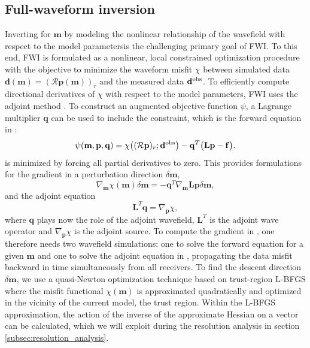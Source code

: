 \documentclass[12pt]{iopart}
\begin{document}
\subsection{Full-waveform inversion}
\label{subsec:FWIproblem}
Inverting for $\mathbf{m}$ by modeling the nonlinear relationship of the wavefield with respect to the model parametersis the challenging primary goal of FWI. To this end, FWI is formulated as a nonlinear, local constrained optimization procedure with the objective to minimize the waveform misfit $\chi$ between simulated data $\mathbf{d}(\mathbf{m})=(\mathcal{R}\mathbf{p}(\mathbf{m}))_r$ and the measured data $\mathbf{d}^{\mbox{\scriptsize obs}}$. To efficiently compute directional derivatives of $\chi$ with respect to the model parameters, FWI uses the adjoint method \cite{Tarantola_1988,Pratt_1999_1,Tromp_adjoints_2005}. To construct an augmented objective function $\psi$, a Lagrange multiplier $\mathbf{q}$ can be used to include the constraint, which is the forward equation in :
\begin{equation}
	\psi(\mathbf{m},\mathbf{p},\mathbf{q})=\chi\big((\mathcal{R}\mathbf{p})_r;\mathbf{d}^{\mbox{\scriptsize obs}}\big)-\mathbf{q}^T\big(\mathbf{L}\mathbf{p}-\mathbf{f}\big).
	\label{eq:Lagrangian_objective}
\end{equation}
 is minimized by forcing all partial derivatives to zero. This provides formulations for the gradient in a perturbation direction $\delta\mathbf{m}$, 
\begin{equation}
	\nabla_{\mathbf{m}}\chi(\mathbf{m})\delta\mathbf{m}=-\mathbf{q}^T\nabla_{\mathbf{m}}\mathbf{L}\mathbf{p}\delta\mathbf{m},
	\label{eq:gradient_misfit}
\end{equation}
and the adjoint equation
\begin{equation}
	\mathbf{L}^T\mathbf{q}=\nabla_{\mathbf{p}}\chi,
	\label{eq:adjoint_equation}
\end{equation}
where $\mathbf{q}$ plays now the role of the adjoint wavefield, $\mathbf{L}^T$ is the adjoint wave operator and $\nabla_{\mathbf{p}}\chi$ is the adjoint source. To compute the gradient in , one therefore needs two wavefield simulations: one to solve the forward equation  for a given $\mathbf{m}$ and one to solve the adjoint equation in , propagating the data misfit backward in time simultaneously from all receivers.  
To find the descent direction $\delta\mathbf{m}$, we use a quasi-Newton optimization technique based on trust-region L-BFGS \cite{Boehm_2018} where the misfit functional $\chi(\mathbf{m})$ is approximated quadratically and optimized in the vicinity of the current model, the trust region. Within the L-BFGS approximation, the action of the inverse of the approximate Hessian on a vector can be calculated, which we will exploit during the resolution analysis in section \ref{subsec:resolution_analysis}. 
  
\end{document}
